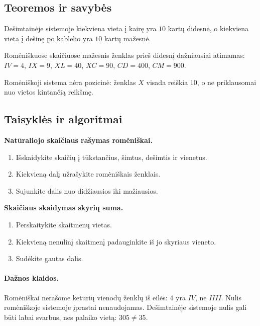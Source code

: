 \subsection{Teoremos ir savybės}
\begin{savybe}
Dešimtainėje sistemoje kiekviena vieta į kairę yra \(10\) kartų didesnė, o kiekviena vieta į dešinę po kablelio yra \(10\) kartų mažesnė.
\end{savybe}
\begin{savybe}
Romėniškuose skaičiuose mažesnis ženklas prieš didesnį dažniausiai atimamas: \(IV=4\), \(IX=9\), \(XL=40\), \(XC=90\), \(CD=400\), \(CM=900\).
\end{savybe}
\begin{savybe}
Romėniškoji sistema nėra pozicinė: ženklas \(X\) visada reiškia \(10\), o ne priklausomai nuo vietos kintančią reikšmę.
\end{savybe}

\subsection{Taisyklės ir algoritmai}
\textbf{Natūraliojo skaičiaus rašymas romėniškai.}
\begin{enumerate}[label=\arabic*.]
\item Išskaidykite skaičių į tūkstančius, šimtus, dešimtis ir vienetus.
\item Kiekvieną dalį užrašykite romėniškais ženklais.
\item Sujunkite dalis nuo didžiausios iki mažiausios.
\end{enumerate}

\textbf{Skaičiaus skaidymas skyrių suma.}
\begin{enumerate}[label=\arabic*.]
\item Perskaitykite skaitmenų vietas.
\item Kiekvieną nenulinį skaitmenį padauginkite iš jo skyriaus vieneto.
\item Sudėkite gautas dalis.
\end{enumerate}

\paragraph{Dažnos klaidos.}
Romėniškai nerašome keturių vienodų ženklų iš eilės: \(4\) yra \(IV\), ne \(IIII\). Nulis romėniškoje sistemoje įprastai nenaudojamas. Dešimtainėje sistemoje nulis gali būti labai svarbus, nes palaiko vietą: \(305\ne 35\).

